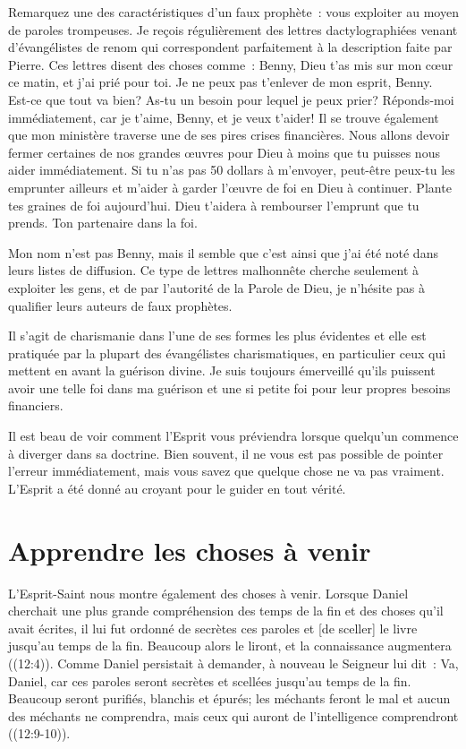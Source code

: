 Remarquez une des caractéristiques d'un faux prophète~:
 \og vous exploiter au moyen de paroles trompeuses. \fg{}
 Je reçois régulièrement des lettres dactylographiées
 venant d'évangélistes de renom qui correspondent parfaitement
 à la description faite par Pierre.
 Ces lettres disent des choses comme~:
 \og Benny, Dieu t'as mis sur mon cœur ce matin, et j'ai prié pour toi.
 Je ne peux pas t'enlever de mon esprit, Benny.
 Est-ce que tout va bien? As-tu un besoin pour lequel je peux prier?
 Réponds-moi immédiatement, car je t'aime, Benny, et je veux t'aider!
 Il se trouve également que mon ministère traverse
 une de ses pires crises financières.
 Nous allons devoir fermer certaines de nos grandes œuvres pour Dieu
 à moins que tu puisses nous aider immédiatement.
 Si tu n'as pas 50 dollars à m'envoyer, peut-être peux-tu les emprunter
 ailleurs et m'aider à garder l'œuvre de foi en Dieu à continuer.
 Plante tes graines de foi aujourd'hui.
 Dieu t'aidera à rembourser l'emprunt que tu prends.
 Ton partenaire dans la foi. \fg{}

Mon nom n'est pas Benny, mais il semble que c'est ainsi que j'ai été noté
 dans leurs listes de diffusion.
 Ce type de lettres malhonnête cherche seulement à exploiter les gens,
 et de par l'autorité de la Parole de Dieu,
 je n'hésite pas à qualifier leurs auteurs de faux prophètes.

Il s'agit de charismanie dans l'une de ses formes les plus évidentes
 et elle est pratiquée par la plupart des évangélistes charismatiques,
 en particulier ceux qui mettent en avant la guérison divine.
 Je suis toujours émerveillé qu'ils puissent avoir une telle foi
 dans ma guérison et une si petite foi pour leur propres besoins financiers.

Il est beau de voir comment l'Esprit vous préviendra
 lorsque quel\-qu'un commence à diverger dans sa doctrine.
 Bien souvent, il ne vous est pas possible de pointer l'erreur immédiatement,
 mais vous savez que quelque chose ne va pas vraiment.
 L'Esprit a été donné au croyant pour le guider en tout vérité.


\section{Apprendre les choses \`a venir}

L'Esprit-Saint nous montre également des choses à venir.
 Lorsque Daniel cherchait une plus grande compréhension des temps de la fin
 et des choses qu'il avait écrites, il lui fut ordonné de
 \og [tenir] secrètes ces paroles et [de sceller] le livre
 jusqu'au temps de la fin.
 Beaucoup alors le liront, et la connaissance augmentera \fg{} \linebreak
 ((12:4)).
 Comme Daniel persistait à demander, à nouveau le Seigneur lui dit~:
 \og Va, Daniel, car ces paroles seront secrètes
 et scellées jusqu'au temps de la fin.
 Beaucoup seront purifiés, blanchis et épurés;
 les méchants feront le mal et aucun des méchants ne comprendra,
 mais ceux qui auront de l'intelligence comprendront \fg{}
 ((12:9-10)).

